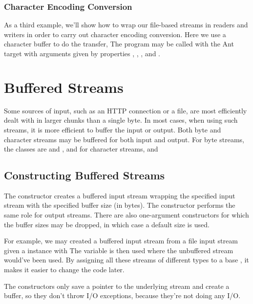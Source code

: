 \subsubsection{Character Encoding Conversion}

As a third example, we'll show how to wrap our file-based streams
in readers and writers in order to carry out character encoding
conversion.  Here we use a character buffer to do the transfer,
%
%
The program may be called with the Ant target
 with arguments given by
properties , , ,
and .  



\section{Buffered Streams}

Some sources of input, such as an HTTP connection or a file, are most
efficiently dealt with in larger chunks than a single byte.  In most
cases, when using such streams, it is more efficient to buffer the
input or output.  Both byte and character streams may be buffered for
both input and output.  For byte streams, the classes are
 and , and for
character streams,  and 

\subsection{Constructing Buffered Streams}

The constructor  creates a
buffered input stream wrapping the specified input stream with the
specified buffer size (in bytes).  The constructor
 performs the same role
for output streams.  There are also one-argument constructors for
which the buffer sizes may be dropped, in which case a default size is
used.

For example, we may created a buffered input stream from
a file input stream given a  instance  with
%
%
The variable  is then used where the unbuffered stream
 would've been used.  By assigning all these streams of
different types to a base , it makes it easier to
change the code later.

The constructors only save a pointer to the underlying stream and
create a buffer, so they don't throw I/O exceptions, because they're
not doing any I/O.


